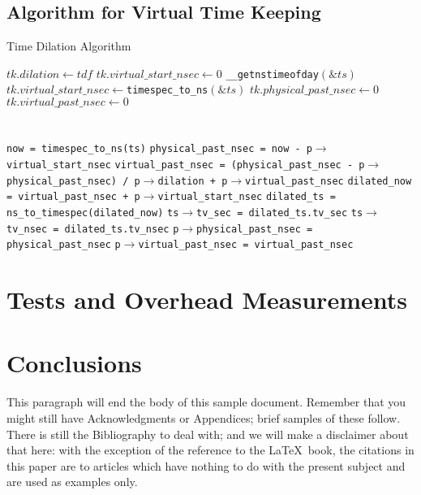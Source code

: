 \documentclass{acm_proc_article-sp}
\begin{document}
\subsection{Algorithm for Virtual Time Keeping}
\begin{algorithm*}[t]
\caption{Time Dilation Algorithm}%
\label{Alg-DilateTimeKeeping}
\begin{algorithmic}[1]
    \State $tk.dilation \gets tdf$
    \State $tk.virtual\_start\_nsec \gets 0$
    \State \texttt{\_\_getnstimeofday}$(\&ts)$
    \State $tk.virtual\_start\_nsec \gets $\texttt{timespec\_to\_ns}$(\&ts)$
    \State $tk.physical\_past\_nsec \gets 0$
    \State $tk.virtual\_past\_nsec \gets 0$
\EndIf
\EndFunction
\\
\EndFunction
\\
\EndFunction
\\
	\State \texttt{now = timespec\_to\_ns(ts)}
	\State \texttt{physical\_past\_nsec = now - p$\rightarrow$virtual\_start\_nsec}
	\State \texttt{virtual\_past\_nsec = (physical\_past\_nsec - p$\rightarrow$physical\_past\_nsec) / p$\rightarrow$dilation + p$\rightarrow$virtual\_past\_nsec}
	\State \texttt{dilated\_now = virtual\_past\_nsec + p$\rightarrow$virtual\_start\_nsec}
	\State \texttt{dilated\_ts = ns\_to\_timespec(dilated\_now)}
	\State \texttt{ts$\rightarrow$tv\_sec = dilated\_ts.tv\_sec}
	\State \texttt{ts$\rightarrow$tv\_nsec = dilated\_ts.tv\_nsec}
	\State \texttt{p$\rightarrow$physical\_past\_nsec = physical\_past\_nsec}
	\State \texttt{p$\rightarrow$virtual\_past\_nsec = virtual\_past\_nsec}
\EndIf
\EndFunction
\end{algorithmic}
\end{algorithm*}

\section{Tests and Overhead Measurements}

\section{Conclusions}
This paragraph will end the body of this sample document.
Remember that you might still have Acknowledgments or
Appendices; brief samples of these
follow.  There is still the Bibliography to deal with; and
we will make a disclaimer about that here: with the exception
of the reference to the \LaTeX\ book, the citations in
this paper are to articles which have nothing to
do with the present subject and are used as
examples only\cite{Lamport:LaTeX}.
\end{document}
